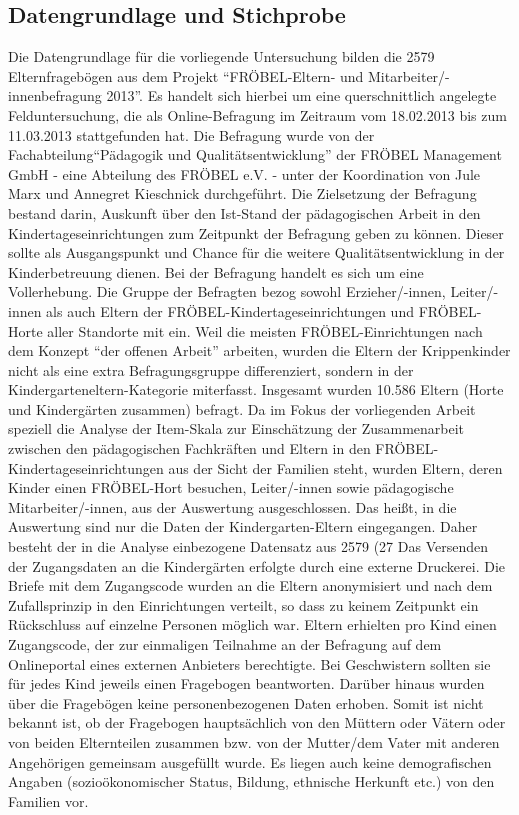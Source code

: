\documentclass[12pt,a4paper]{article}
\begin{document}
\subsection{Datengrundlage und Stichprobe}
Die Datengrundlage für die vorliegende Untersuchung bilden die 2579 Elternfragebögen aus dem Projekt "`FRÖBEL-Eltern- und Mitarbeiter/-innenbefragung 2013"'. Es handelt sich hierbei um eine querschnittlich angelegte Felduntersuchung, die als Online-Befragung im Zeitraum vom 18.02.2013 bis zum 11.03.2013 stattgefunden hat. Die Befragung wurde von der Fachabteilung"`Pädagogik und Qualitätsentwicklung"' der FRÖBEL Management GmbH - eine Abteilung des FRÖBEL e.V. - unter der Koordination von Jule Marx und Annegret Kieschnick durchgeführt. Die Zielsetzung der Befragung bestand darin, Auskunft über den Ist-Stand der pädagogischen Arbeit in den Kindertageseinrichtungen zum Zeitpunkt der Befragung geben zu können. Dieser sollte als  Ausgangspunkt und Chance für die weitere Qualitätsentwicklung in der Kinderbetreuung dienen.
	Bei der Befragung handelt es sich um eine Vollerhebung. Die Gruppe der Befragten bezog sowohl Erzieher/-innen, Leiter/-innen als auch Eltern der FRÖBEL-Kindertageseinrichtungen und FRÖBEL-Horte aller Standorte mit ein. Weil die meisten FRÖBEL-Einrichtungen nach dem Konzept "`der offenen Arbeit"' arbeiten, wurden die Eltern der Krippenkinder nicht als eine extra Befragungsgruppe differenziert, sondern in der Kindergarteneltern-Kategorie miterfasst. Insgesamt wurden 10.586 Eltern (Horte und Kindergärten zusammen) befragt. Da im Fokus der vorliegenden Arbeit speziell die Analyse der Item-Skala zur Einschätzung der Zusammenarbeit zwischen den pädagogischen Fachkräften und Eltern in den FRÖBEL-Kindertageseinrichtungen aus der Sicht der Familien steht, wurden Eltern, deren Kinder einen FRÖBEL-Hort besuchen, Leiter/-innen sowie pädagogische Mitarbeiter/-innen, aus der Auswertung ausgeschlossen. Das heißt, in die Auswertung sind nur die Daten der Kindergarten-Eltern eingegangen. Daher besteht der in die Analyse einbezogene Datensatz aus 2579 (27%
	Das Versenden der Zugangsdaten an die Kindergärten erfolgte durch eine externe Druckerei. Die Briefe mit dem Zugangscode wurden an die Eltern anonymisiert und nach dem Zufallsprinzip in den Einrichtungen verteilt, so dass zu keinem Zeitpunkt ein Rückschluss auf einzelne Personen möglich war. Eltern erhielten pro Kind einen Zugangscode, der zur einmaligen Teilnahme an der Befragung auf dem Onlineportal eines externen Anbieters berechtigte. Bei Geschwistern sollten sie für jedes Kind jeweils einen Fragebogen beantworten. Darüber hinaus wurden über die Fragebögen keine personenbezogenen Daten erhoben. Somit ist nicht bekannt ist, ob der Fragebogen hauptsächlich von den Müttern oder Vätern oder von beiden Elternteilen zusammen bzw. von der Mutter/dem Vater mit anderen Angehörigen gemeinsam ausgefüllt wurde. Es liegen auch keine demografischen Angaben (sozioökonomischer Status, Bildung, ethnische Herkunft etc.) von den Familien vor. 
\end{document}
